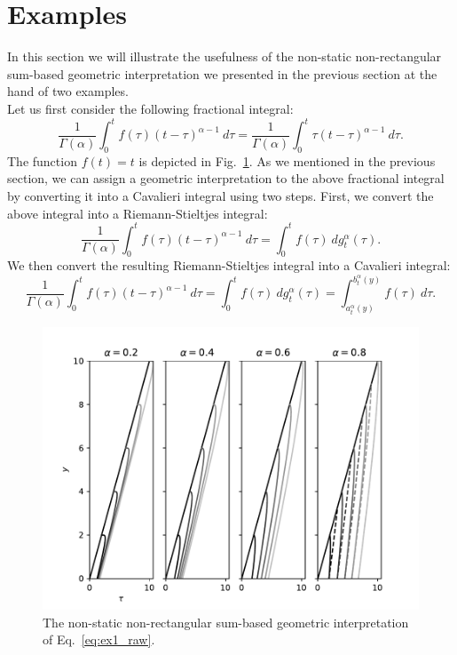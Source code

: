 \documentclass{article}
\theoremstyle{theorem}
\theoremstyle{definition}
\begin{document}
\section{Examples}
In this section we will illustrate the usefulness of the non-static non-rectangular sum-based geometric interpretation we presented in the previous section at the 
hand of two examples.\\

\noindent
Let us first consider the following fractional integral:
\begin{equation}
\label{eq:ex1_raw}
\frac{1}{\Gamma(\alpha)}\int_0^t f(\tau) (t-\tau)^{\alpha-1}~d\tau = \frac{1}{\Gamma(\alpha)}\int_0^t \tau(t-\tau)^{\alpha-1}~d\tau. 
\end{equation}
The function $f(t) =t$ is depicted in Fig.~\ref{fig:geo1}. As we mentioned in the previous section, we can assign a geometric interpretation to the above fractional integral by converting it into a Cavalieri integral using two steps. First, we convert 
the above integral into a Riemann-Stieltjes integral:
\begin{equation}
\frac{1}{\Gamma(\alpha)}\int_0^t f(\tau) (t-\tau)^{\alpha-1}~d\tau = \int_0^t f(\tau)~dg_t^{\alpha}(\tau). 
\end{equation}
We then convert the resulting Riemann-Stieltjes integral into a Cavalieri integral:
\begin{equation}
\label{eq:ex1}
\frac{1}{\Gamma(\alpha)}\int_0^t f(\tau) (t-\tau)^{\alpha-1}~d\tau = \int_0^t f(\tau)~dg_t^{\alpha}(\tau)=\int_{a_t^{\alpha}(y)}^{b_t^{\alpha}(y)} f(\tau)~d\tau. 
\end{equation}

\begin{figure}[htb]
\centering
\includegraphics[width=1\textwidth]{geo_int1.pdf}
\caption{The non-static non-rectangular sum-based geometric interpretation of Eq.~\eqref{eq:ex1_raw}.}
\label{fig:geo1}
\end{figure}
\end{document}
